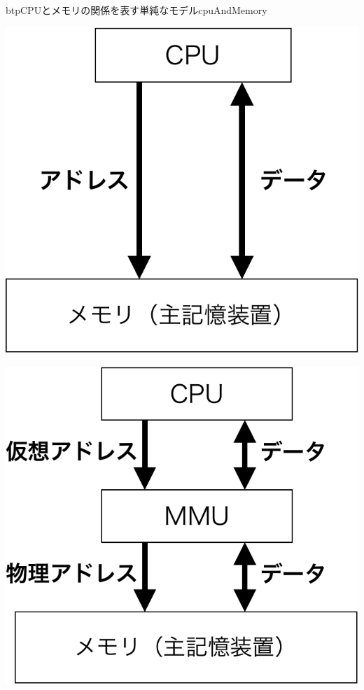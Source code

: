 \begin{myfig}{btp}{CPUとメモリの関係を表す単純なモデル}{cpuAndMemory}
  \begin{minipage}{0.49\columnwidth}
    \begin{center}
      \includegraphics[scale=0.4]{Fig/cpuMemory-crop.pdf}
      \label{fig:cpuMemory}
    \end{center}
  \end{minipage}
  \begin{minipage}{0.49\columnwidth}
    \begin{center}
      \includegraphics[scale=0.4]{Fig/cpuMmuMemory-crop.pdf}
      \label{fig:cpuMmuMemory}
    \end{center}
  \end{minipage}
\end{myfig}

